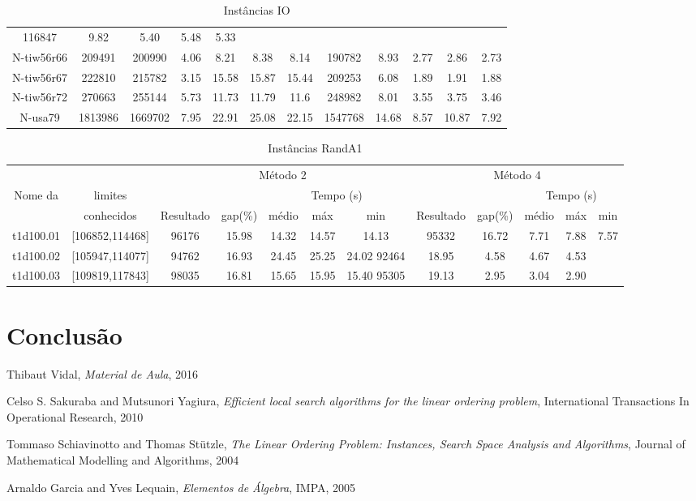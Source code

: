 \documentclass[a4paper,10pt,onecolumn]{article}
\begin{document}
{\begin{table}[htbp]
\begin{tabular}{|c|c|ccccc|ccccc|}
116847 & 9.82 & 5.40   & 5.48  & 5.33
\\
    N-tiw56r66 & 209491 &
200990 & 4.06 & 8.21   & 8.38  & 8.14 &
190782 & 8.93 & 2.77   & 2.86  & 2.73 
\\
    N-tiw56r67 & 222810 &
215782 & 3.15 & 15.58   & 15.87  & 15.44 &
209253 & 6.08 & 1.89   & 1.91  & 1.88 
\\
    N-tiw56r72 & 270663 &
255144 & 5.73 & 11.73   & 11.79  & 11.6 &
248982 & 8.01 & 3.55   & 3.75  & 3.46 
\\
    N-usa79 & 1813986 &
1669702 & 7.95 & 22.91   & 25.08  & 22.15 &
1547768 & 14.68 & 8.57   & 10.87  & 7.92 
\\

\hline
  \end{tabular}
  \caption{Instâncias IO}
\end{table}
\clearpage
}
\begin{table}[htbp]
  \noindent
  \footnotesize
  \centering
  \begin{tabular*}{\linewidth}{|c|c|ccccc|ccccc|}
    \hline 
    &  & 
    \multicolumn{5}{c|}{Método 2} &
    \multicolumn{5}{c|}{Método 4} \\
    Nome da & limites & 
    && \multicolumn{3}{c|}{Tempo (s)} &
    && \multicolumn{3}{c|}{Tempo (s)} \\
    &  conhecidos & 
    Resultado & gap(\%) & médio & máx & min &
    Resultado & gap(\%)  & médio & máx & min 
\\
    \hline
t1d100.01 & [106852,114468] &
96176 & 15.98 & 14.32   & 14.57  & 14.13 &
95332 & 16.72 & 7.71   & 7.88  & 7.57 \\
t1d100.02 & [105947,114077] &
94762 & 16.93 & 24.45   & 25.25  & 24.02
92464 & 18.95 & 4.58   & 4.67  & 4.53 \\
t1d100.03 & [109819,117843] &
98035 & 16.81 & 15.65   & 15.95  & 15.40
95305 & 19.13 & 2.95   & 3.04  & 2.90 \\
    \hline
  \end{tabular*}
  \caption{Instâncias RandA1}
\end{table}

\section{Conclusão}

\begin{thebibliography}{99}
 Thibaut Vidal, \emph{Material de Aula}, 2016

 Celso S. Sakuraba and Mutsunori Yagiura,
\emph{Efficient local search algorithms for the linear ordering problem},
International Transactions In Operational Research, 2010

 Tommaso Schiavinotto and Thomas Stützle, \emph{The Linear
Ordering Problem: Instances, Search Space Analysis and Algorithms}, Journal of
Mathematical Modelling and Algorithms, 2004

 Arnaldo Garcia and Yves Lequain, \emph{Elementos de
Álgebra}, IMPA, 2005


\end{thebibliography}
\end{document}
